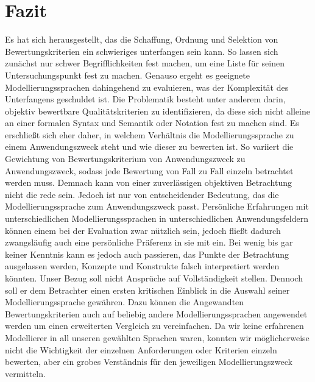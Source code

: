 \chapter{Fazit}
\label{ch:Fazit}
Es hat sich herausgestellt, das die Schaffung, Ordnung und Selektion von Bewertungskriterien ein schwieriges unterfangen sein kann.
So lassen sich zunächst nur schwer Begrifflichkeiten fest machen, um eine Liste für seinen Untersuchungspunkt fest zu machen.
Genauso ergeht es geeignete Modellierungssprachen dahingehend zu evaluieren, was der Komplexität des Unterfangens geschuldet ist.
Die Problematik besteht unter anderem darin, objektiv bewertbare Qualitätskriterien zu identifizieren,
da diese sich nicht alleine an einer formalen Syntax und Semantik oder Notation fest zu machen sind. Es erschließt sich eher daher, in welchem Verhältnis die Modellierungssprache zu einem Anwendungszweck steht und wie dieser zu bewerten ist. So variiert die Gewichtung von Bewertungskriterium von Anwendungszweck zu Anwendungszweck, sodass jede Bewertung von Fall zu Fall einzeln betrachtet werden muss. Demnach kann von einer zuverlässigen objektiven Betrachtung nicht die rede sein. Jedoch ist nur von entscheidender Bedeutung, das die Modellierungssprache zum Anwendungszweck passt. Persönliche Erfahrungen mit unterschiedlichen Modellierungssprachen in unterschiedlichen Anwendungsfeldern können einem bei der Evaluation zwar nützlich sein, jedoch fließt dadurch zwangsläufig auch eine persönliche Präferenz in sie mit ein. Bei wenig bis gar keiner Kenntnis kann es jedoch auch passieren, das Punkte der Betrachtung ausgelassen werden, Konzepte und Konstrukte falsch interpretiert werden könnten. Unser Bezug soll nicht Ansprüche auf Vollständigkeit stellen. Dennoch soll er dem Betrachter einen ersten kritischen Einblick in die Auswahl seiner Modellierungssprache gewähren. Dazu können die Angewandten Bewertungskriterien auch auf beliebig andere Modellierungssprachen angewendet werden um einen erweiterten Vergleich zu vereinfachen. Da wir keine erfahrenen Modellierer in all unseren gewählten Sprachen waren, konnten wir möglicherweise nicht die Wichtigkeit der einzelnen Anforderungen oder Kriterien einzeln bewerten, aber ein grobes Verständnis für den jeweiligen Modellierungszweck vermitteln. 
